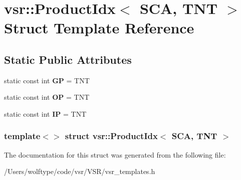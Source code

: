 \hypertarget{structvsr_1_1_product_idx_3_01_s_c_a_00_01_t_n_t_01_4}{\section{vsr\-:\-:Product\-Idx$<$ S\-C\-A, T\-N\-T $>$ Struct Template Reference}
\label{structvsr_1_1_product_idx_3_01_s_c_a_00_01_t_n_t_01_4}
}
\subsection*{Static Public Attributes}
\begin{DoxyCompactItemize}
\item 
\hypertarget{structvsr_1_1_product_idx_3_01_s_c_a_00_01_t_n_t_01_4_adc95f6cc58aa5e35e307ac4528b49f68}{static const int {\bfseries G\-P} = T\-N\-T}\label{structvsr_1_1_product_idx_3_01_s_c_a_00_01_t_n_t_01_4_adc95f6cc58aa5e35e307ac4528b49f68}

\item 
\hypertarget{structvsr_1_1_product_idx_3_01_s_c_a_00_01_t_n_t_01_4_abbfe1e24fc7e51bd2df8b01619e33404}{static const int {\bfseries O\-P} = T\-N\-T}\label{structvsr_1_1_product_idx_3_01_s_c_a_00_01_t_n_t_01_4_abbfe1e24fc7e51bd2df8b01619e33404}

\item 
\hypertarget{structvsr_1_1_product_idx_3_01_s_c_a_00_01_t_n_t_01_4_af9ad20838dd6314b77aeff8a7b8f6fd8}{static const int {\bfseries I\-P} = T\-N\-T}\label{structvsr_1_1_product_idx_3_01_s_c_a_00_01_t_n_t_01_4_af9ad20838dd6314b77aeff8a7b8f6fd8}

\end{DoxyCompactItemize}
\subsubsection*{template$<$$>$ struct vsr\-::\-Product\-Idx$<$ S\-C\-A, T\-N\-T $>$}



The documentation for this struct was generated from the following file\-:\begin{DoxyCompactItemize}
\item 
/\-Users/wolftype/code/vsr/\-V\-S\-R/vsr\-\_\-templates.\-h\end{DoxyCompactItemize}
